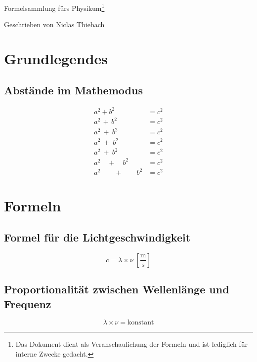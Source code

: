 \documentclass{article}
\begin{document}
\vfill

\begin{center}
    {\Large Formelsammlung fürs Physikum}\footnote{Das Dokument dient als Veranschaulichung der Formeln und ist lediglich für interne Zwecke gedacht.}

    \vspace{1cm}
    
    Geschrieben von Niclas Thiebach
\end{center}

\vfill

\newpage

\section{Grundlegendes}

\subsection{Abstände im Mathemodus}
\begin{align*}
    a^2 \! + \! b^2 &= c^2 \\
    a^2 \, + \, b^2 &= c^2 \\
    a^2 \: + \: b^2 &= c^2 \\
    a^2 \; + \; b^2 &= c^2 \\
    a^2 \ + \ b^2 &= c^2 \\
    a^2 \quad + \quad b^2 &= c^2 \\
    a^2 \qquad + \qquad b^2 &= c^2
\end{align*}


\section{Formeln}

\subsection{Formel für die Lichtgeschwindigkeit}
\begin{equation}
    c = \lambda \times \nu \; \mathrm{\left[\frac{m}{s}\right]}
\end{equation}

\subsection{Proportionalität zwischen Wellenlänge und Frequenz}
\begin{equation}
    \lambda \times \nu = \mathrm{konstant}
\end{equation}
\end{document}
